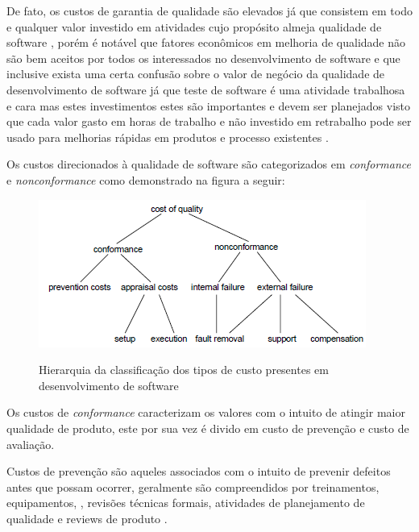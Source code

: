 \documentclass[
	12pt,				%
	oneside,			%
	a4paper,			%
	english,			%
	brazil				%
	]{abntex2ppgsi}
\begin{document}
De fato, os custos de garantia de qualidade são elevados \cite{wagner2005} \cite{Korel1990} já que consistem em todo e qualquer valor investido em atividades cujo propósito almeja qualidade de software \cite{pressman2009engenharia}, porém é notável que fatores econômicos em melhoria de qualidade não são bem aceitos por todos os interessados no desenvolvimento de software e que inclusive exista uma certa confusão sobre o valor de negócio da qualidade de desenvolvimento de software \cite{slaughter1998} já que teste de software é uma atividade trabalhosa e cara \cite{Korel1990} mas estes investimentos estes são importantes e devem ser planejados visto que cada valor gasto em horas de trabalho e não investido em retrabalho pode ser usado para melhorias rápidas em produtos e processo existentes \cite{slaughter1998}.

Os custos direcionados à qualidade de software são categorizados em \textit{conformance} e \textit{nonconformance} \cite{ slaughter1998}\cite{pressman2009engenharia} como demonstrado na figura a seguir: 

\begin{figure}[H]%
	\centering
 	  \caption{Hierarquia da classificação dos tipos de custo presentes em desenvolvimento de software}
		\includegraphics{tipos-custo-arvore.png}
	\label{fig:tipos-custo-arvore}
\end{figure}

Os custos de \textit{conformance} caracterizam os valores com o intuito de atingir maior qualidade de produto, este por sua vez é divido em custo de prevenção e custo de avaliação. \cite{ wagner2005}

Custos de prevenção são aqueles associados com o intuito de prevenir defeitos antes que possam ocorrer, geralmente são compreendidos por treinamentos, equipamentos, , revisões técnicas formais, atividades de planejamento de qualidade e reviews de produto \cite{wagner2005} \cite{pressman2009engenharia}.
\end{document}
